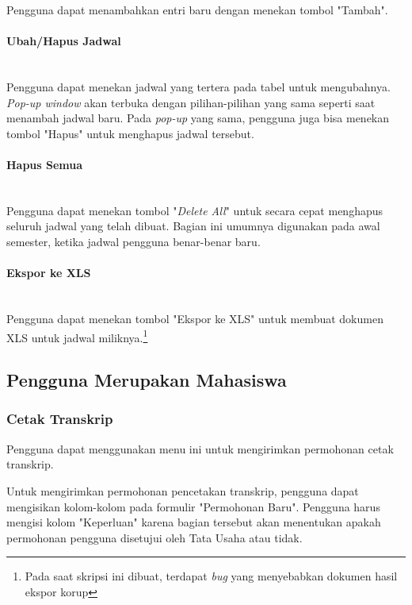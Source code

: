 Pengguna dapat menambahkan entri baru dengan menekan tombol "Tambah".

\paragraph{Ubah/Hapus Jadwal}
\label{sec:bluetape_ubah_hapus_jadwal}
\phantom{blank}\\

Pengguna dapat menekan jadwal yang tertera pada tabel untuk mengubahnya. \textit{Pop-up window} akan terbuka dengan pilihan-pilihan yang sama seperti saat menambah jadwal baru. Pada \textit{pop-up} yang sama, pengguna juga bisa menekan tombol "Hapus" untuk menghapus jadwal tersebut.

\paragraph{Hapus Semua}
\label{sec:bluetape_hapus_semua}
\phantom{blank}\\

Pengguna dapat menekan tombol "\textit{Delete All}" untuk secara cepat menghapus seluruh jadwal yang telah dibuat. Bagian ini umumnya digunakan pada awal semester, ketika jadwal pengguna benar-benar baru.

\paragraph{Ekspor ke XLS}
\label{sec:bluetape_ekspor_ke_xls}
\phantom{blank}\\

Pengguna dapat menekan tombol "Ekspor ke XLS" untuk membuat dokumen XLS untuk jadwal miliknya.\footnote{Pada saat skripsi ini dibuat, terdapat \textit{bug} yang menyebabkan dokumen hasil ekspor korup}

\subsection{Pengguna Merupakan Mahasiswa}
\label{sec:bluetape_mahasiswa}

\subsubsection{Cetak Transkrip}
\label{sec:bluetape_cetak_transkrip}
Pengguna dapat menggunakan menu ini untuk mengirimkan permohonan cetak transkrip.

Untuk mengirimkan permohonan pencetakan transkrip, pengguna dapat mengisikan kolom-kolom pada formulir "Permohonan Baru". Pengguna harus mengisi kolom "Keperluan" karena bagian tersebut akan menentukan apakah permohonan pengguna disetujui oleh Tata Usaha atau tidak.

